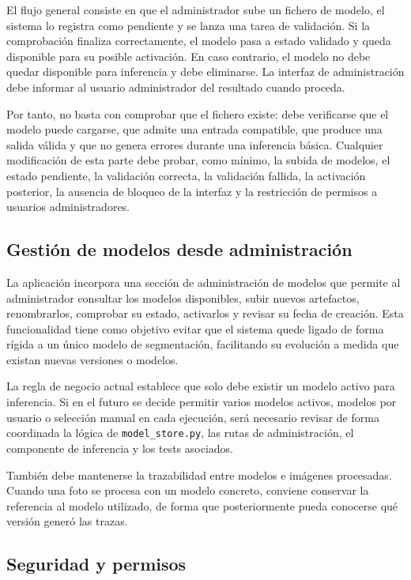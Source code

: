 El flujo general consiste en que el administrador sube un fichero de modelo, el sistema lo registra como pendiente y se lanza una tarea de validación. Si la comprobación finaliza correctamente, el modelo pasa a estado validado y queda disponible para su posible activación. En caso contrario, el modelo no debe quedar disponible para inferencia y debe eliminarse. La interfaz de administración debe informar al usuario administrador del resultado cuando proceda. 

Por tanto, no basta con comprobar que el fichero existe: debe verificarse que el modelo puede cargarse, que admite una entrada compatible, que produce una salida válida y que no genera errores durante una inferencia básica. Cualquier modificación de esta parte debe probar, como mínimo, la subida de modelos, el estado pendiente, la validación correcta, la validación fallida, la activación posterior, la ausencia de bloqueo de la interfaz y la restricción de permisos a usuarios administradores. 

\subsection{Gestión de modelos desde administración}

La aplicación incorpora una sección de administración de modelos que permite al administrador consultar los modelos disponibles, subir nuevos artefactos, renombrarlos, comprobar su estado, activarlos y revisar su fecha de creación. Esta funcionalidad tiene como objetivo evitar que el sistema quede ligado de forma rígida a un único modelo de segmentación, facilitando su evolución a medida que existan nuevas versiones o modelos.

La regla de negocio actual establece que solo debe existir un modelo activo para inferencia. Si en el futuro se decide permitir varios modelos activos, modelos por usuario o selección manual en cada ejecución, será necesario revisar de forma coordinada la lógica de \texttt{model\_store.py}, las rutas de administración, el componente de inferencia y los tests asociados.

También debe mantenerse la trazabilidad entre modelos e imágenes procesadas. Cuando una foto se procesa con un modelo concreto, conviene conservar la referencia al modelo utilizado, de forma que posteriormente pueda conocerse qué versión generó las trazas.

\subsection{Seguridad y permisos}

